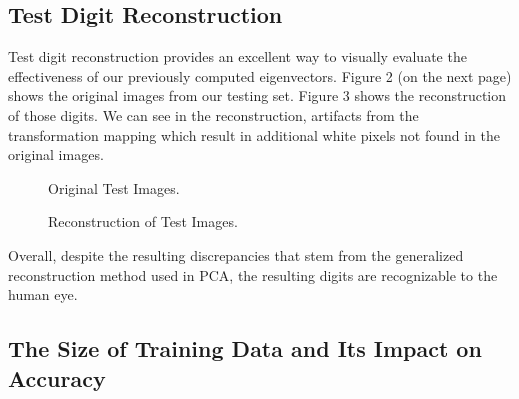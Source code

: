 \documentclass[12pt]{article}
\begin{document}
\subsection{Test Digit Reconstruction}

Test digit reconstruction provides an excellent way to visually evaluate the effectiveness of our previously computed eigenvectors. Figure 2 (on the next page) shows the original  images from our testing set. Figure 3 shows the reconstruction of those digits. We can see in the reconstruction, artifacts from the transformation mapping which result in additional white pixels not found in the original images.

\begin{figure}[!htb]
    \centering
    \caption{Original Test Images.}
\end{figure}

\begin{figure}[!htb]
    \centering
    \caption{Reconstruction of Test Images.}
\end{figure}
\FloatBarrier

\noindent

Overall, despite the resulting discrepancies that stem from the generalized reconstruction method used in PCA, the resulting digits are recognizable to the human eye.

\subsection{The Size of Training Data and Its Impact on Accuracy}
\end{document}
